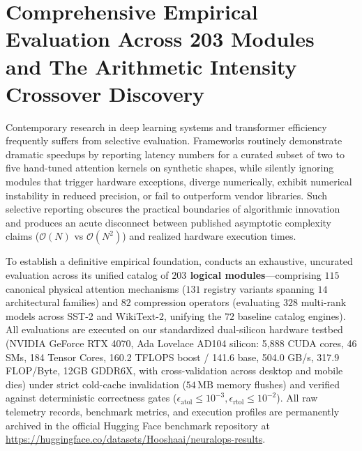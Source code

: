 \section{Comprehensive Empirical Evaluation Across 203 Modules and The Arithmetic Intensity Crossover Discovery}
\label{sec:empirical_results}

Contemporary research in deep learning systems and transformer efficiency frequently suffers from selective evaluation. Frameworks routinely demonstrate dramatic speedups by reporting latency numbers for a curated subset of two to five hand-tuned attention kernels on synthetic shapes, while silently ignoring modules that trigger hardware exceptions, diverge numerically, exhibit numerical instability in reduced precision, or fail to outperform vendor libraries. Such selective reporting obscures the practical boundaries of algorithmic innovation and produces an acute disconnect between published asymptotic complexity claims ($\mathcal{O}(N)$ vs $\mathcal{O}(N^2)$) and realized hardware execution times.

To establish a definitive empirical foundation, \neuralops{} conducts an exhaustive, uncurated evaluation across its unified catalog of \textbf{$203$ logical modules}---comprising $115$ canonical physical attention mechanisms ($131$ registry variants spanning $14$ architectural families) and $82$ compression operators (evaluating $328$ multi-rank models across SST-2 and WikiText-2, unifying the $72$ baseline catalog engines). All evaluations are executed on our standardized dual-silicon hardware testbed (NVIDIA GeForce RTX 4070, Ada Lovelace AD104 silicon: 5,888 CUDA cores, 46 SMs, 184 Tensor Cores, 160.2 TFLOPS boost / 141.6 base, 504.0 GB/s, 317.9 FLOP/Byte, 12GB GDDR6X, with cross-validation across desktop and mobile dies) under strict cold-cache invalidation ($54\,\text{MB}$ memory flushes) and verified against deterministic correctness gates ($\epsilon_{\text{atol}} \le 10^{-3}, \epsilon_{\text{rtol}} \le 10^{-2}$). All raw telemetry records, benchmark metrics, and execution profiles are permanently archived in the official Hugging Face benchmark repository at \url{https://huggingface.co/datasets/Hooshaai/neuralops-results}.

